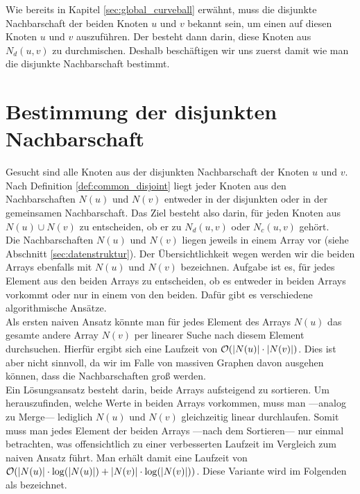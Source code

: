 Wie bereits in Kapitel \ref{sec:global_curveball} erwähnt, muss die disjunkte Nachbarschaft
der beiden Knoten $u$ und $v$ bekannt sein, um einen \ct{} auf diesen Knoten $u$ und $v$
auszuführen. Der \ct{} besteht dann darin, diese Knoten aus $N_{d}(u,v)$ zu durchmischen.
Deshalb beschäftigen wir uns zuerst damit wie man die disjunkte Nachbarschaft bestimmt.


\section{Bestimmung der disjunkten Nachbarschaft}
\label{sec:common}
Gesucht sind alle Knoten aus der disjunkten Nachbarschaft der Knoten $u$ und $v$.
Nach Definition \ref{def:common_disjoint} liegt jeder Knoten aus den Nachbarschaften $N(u)$ und $N(v)$ 
entweder in der disjunkten oder in der gemeinsamen Nachbarschaft. Das Ziel besteht also darin, 
für jeden Knoten aus $N(u) \cup N(v)$ zu entscheiden, ob er zu $N_{d}(u,v)$ oder $N_{c}(u,v)$ gehört.
\\

Die Nachbarschaften $N(u)$ und $N(v)$ liegen jeweils
in einem Array vor (siehe Abschnitt \ref{sec:datenstruktur}). Der Übersichtlichkeit 
wegen werden wir die beiden
Arrays ebenfalls mit $N(u)$ und $N(v)$ bezeichnen. Aufgabe ist es,
 für jedes Element aus den beiden Arrays zu entscheiden,
ob es entweder in beiden Arrays vorkommt oder nur in einem von den beiden. Dafür 
gibt es verschiedene algorithmische Ansätze.
\\

Als ersten naiven Ansatz könnte man für jedes Element des Arrays $N(u)$ das gesamte andere 
Array $N(v)$ per linearer Suche nach diesem Element durchsuchen. Hierfür ergibt sich eine Laufzeit von
$\mathcal{O}(|N(u)|\cdot|N(v)|)$. Dies ist aber nicht sinnvoll, da wir 
im Falle von massiven Graphen davon ausgehen können, dass die Nachbarschaften
 groß werden. 
\\

Ein Lösungsansatz besteht darin, beide Arrays aufsteigend zu sortieren. 
Um herauszufinden,
welche Werte in beiden Arrays vorkommen, muss man ---analog zu Merge--- lediglich $N(u)$ und $N(v)$
gleichzeitig linear durchlaufen. Somit muss man jedes 
Element der beiden Arrays ---nach dem Sortieren--- 
nur einmal betrachten, was offensichtlich zu einer verbesserten Laufzeit im Vergleich zum naiven
Ansatz führt. Man erhält damit eine Laufzeit von $\mathcal{O}(|N(u)|\cdot \log (|N(u)|)  + |N(v)|\cdot\log(|N(v)|))$. 
Diese Variante wird im Folgenden als \SorSor{} bezeichnet. 
\\

